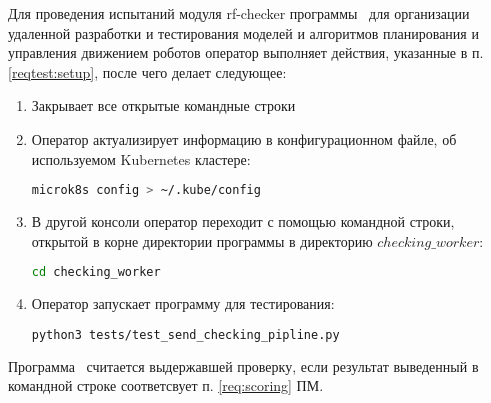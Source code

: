 Для проведения испытаний модуля rf-checker  программы \productname\ для организации удаленной разработки и тестирования моделей и алгоритмов планирования и управления движением роботов оператор выполняет действия, указанные в п. \ref{reqtest:setup}, после чего делает следующее:
\begin{enumerate}
    \item Закрывает все открытые командные строки
    \item Оператор актуализирует информацию в конфигурационном файле, об используемом Kubernetes кластере:
    \begin{lstlisting}[language=bash, numbers=none, frame=single]
        microk8s config > ~/.kube/config
    \end{lstlisting}
    \item В другой консоли оператор переходит с помощью командной строки, открытой в корне директории программы в директорию $checking\_worker$:
    \begin{lstlisting}[language=bash, numbers=none, frame=single]
    cd checking_worker
    \end{lstlisting}
    \item Оператор запускает программу для тестирования:
    \begin{lstlisting}[language=bash, numbers=none, frame=single]
    python3 tests/test_send_checking_pipline.py
    \end{lstlisting}
\end{enumerate}
Программа \programname\ считается выдержавшей проверку, если результат выведенный в командной строке соответсвует п. \ref{req:scoring} ПМ.

